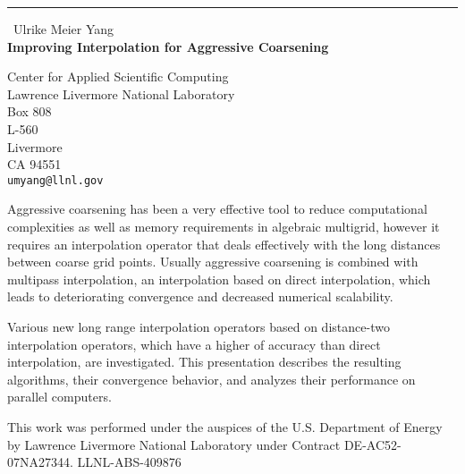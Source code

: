\documentclass{report}
\begin{document}
\begin{center}
\rule{6in}{1pt} \
{\large Ulrike Meier Yang \\
{\bf Improving Interpolation for Aggressive Coarsening}}

Center for Applied Scientific Computing \\ Lawrence Livermore National Laboratory \\ Box 808 \\ L-560 \\ Livermore \\ CA 94551
\\
{\tt umyang@llnl.gov}\end{center}

Aggressive coarsening has been a very effective tool to reduce
computational complexities as well as memory requirements in algebraic
multigrid, however it requires an interpolation operator that deals
effectively with the long distances between coarse grid points. Usually
aggressive coarsening is combined with multipass interpolation, an
interpolation based on direct interpolation, which leads to deteriorating
convergence and decreased numerical scalability.

Various new long range interpolation operators based on distance-two
interpolation operators, which have a higher of accuracy than direct
interpolation, are investigated. This presentation describes the
resulting algorithms, their convergence behavior, and analyzes their
performance on parallel computers.


This work was performed under the auspices of the U.S. Department of
Energy by Lawrence Livermore National Laboratory under Contract
DE-AC52-07NA27344. LLNL-ABS-409876
\end{document}
